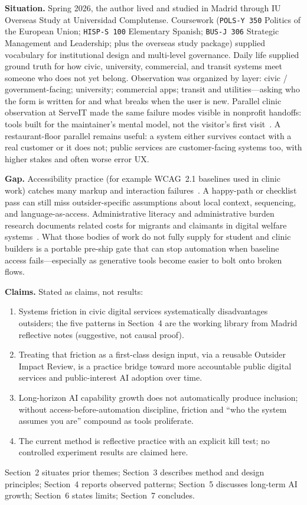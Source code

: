 \documentclass[10pt,twocolumn]{article}
\begin{document}
\textbf{Situation.} Spring 2026, the author lived and studied in Madrid through
IU Overseas Study at Universidad Complutense. Coursework
(\texttt{POLS-Y~350} Politics of the European Union; \texttt{HISP-S~100}
Elementary Spanish; \texttt{BUS-J~306} Strategic Management and Leadership; plus
the overseas study package) supplied vocabulary for institutional design and
multi-level governance. Daily life supplied ground truth for how civic,
university, commercial, and transit systems meet someone who does not yet
belong. Observation was organized by layer: civic / government-facing;
university; commercial apps; transit and utilities---asking who the form is
written for and what breaks when the user is new. Parallel clinic observation
at ServeIT made the same failure modes visible in nonprofit handoffs: tools
built for the maintainer's mental model, not the visitor's first
visit~\cite{serveit}. A restaurant-floor parallel remains useful: a system
either survives contact with a real customer or it does not; public services
are customer-facing systems too, with higher stakes and often worse error UX.

\textbf{Gap.} Accessibility practice (for example WCAG~2.1 baselines used in
clinic work) catches many markup and interaction failures~\cite{wcag21}. A
happy-path or checklist pass can still miss outsider-specific assumptions about
local context, sequencing, and language-as-access. Administrative literacy and
administrative burden research documents related costs for migrants and claimants
in digital welfare systems~\cite{safarov2023,moynihan2015}. What those bodies of
work do not fully supply for student and clinic builders is a portable
pre-ship gate that can stop automation when baseline access fails---especially
as generative tools become easier to bolt onto broken flows.

\textbf{Claims.} Stated as claims, not results:
\begin{enumerate}
  \item Systems friction in civic digital services systematically disadvantages
        outsiders; the five patterns in Section~4 are the working library from
        Madrid reflective notes (suggestive, not causal proof).
  \item Treating that friction as a first-class design input, via a reusable
        Outsider Impact Review, is a practice bridge toward more accountable
        public digital services and public-interest AI adoption over time.
  \item Long-horizon AI capability growth does not automatically produce
        inclusion; without access-before-automation discipline, friction and
        ``who the system assumes you are'' compound as tools proliferate.
  \item The current method is reflective practice with an explicit kill test;
        no controlled experiment results are claimed here.
\end{enumerate}
Section~2 situates prior themes; Section~3 describes method and design
principles; Section~4 reports observed patterns; Section~5 discusses long-term
AI growth; Section~6 states limits; Section~7 concludes.
\end{document}

